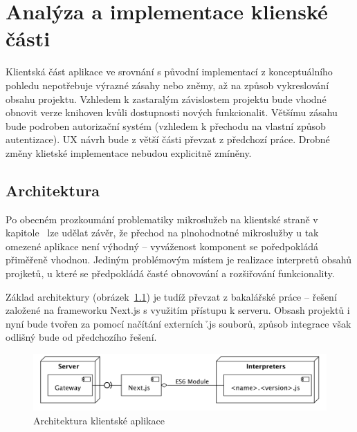 \chapter{Analýza a implementace klienské části}\label{ch:client}


Klientská část aplikace ve srovnání s původní implementací z konceptuálního pohledu nepotřebuje výrazné zásahy nebo zněmy, až na způsob vykreslování obsahu projektu.
Vzhledem k zastaralým závislostem projektu bude vhodné obnovit verze knihoven kvůli dostupnosti nových funkcionalit.
Většímu zásahu bude podroben autorizační systém (vzhledem k přechodu na vlastní způsob autentizace).
UX návrh bude z větší části převzat z předchozí práce.
Drobné změny klietské implementace nebudou explicitně zmíněny.



\section{Architektura}\label{sec:client-arch}
Po obecném prozkoumání problematiky mikroslužeb na klientské straně v kapitole~ lze udělat závěr, že přechod na plnohodnotné mikroslužby u tak omezené aplikace není výhodný – vyváženost komponent se poředpokládá přiměřeně vhodnou.
Jediným problémovým místem je realizace interpretů obsahů projketů, u které se předpokládá časté obnovování a rozšiřování funkcionality.

Základ architektury (obrázek~\ref{fig:client-arch}) je tudíž převzat z bakalářské práce – řešení založené na frameworku Next.js s využitím  přístupu k serveru.
Obsash projektů i nyní bude tvořen za pomocí načítání externích \h{.js} souborů, způsob integrace však odlišný bude od předchozího řešení.


\begin{figure}[htbp]
   \centering
   \includegraphics[max width=\textwidth]{assets/fe-arch}
   \caption{Architektura klientské aplikace}\label{fig:client-arch}
\end{figure}



